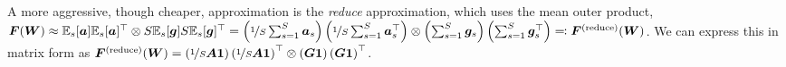 A more aggressive, though cheaper, approximation is the \emph{reduce} approximation, which uses the mean outer product, ${\bm{F}}({\bm{W}}) \approx \mathbb{E}_s[{\bm{a}}] \mathbb{E}_s[{\bm{a}}]^{\top} \otimes S \mathbb{E}_s[{\bm{g}}] S \mathbb{E}_s[{\bm{g}}]^{\top} = \left(\nicefrac{1}{S} \sum_{s=1}^S {\bm{a}}_s \right) \left( \nicefrac{1}{S} \sum_{s=1}^S {\bm{a}}_s^{\top}\right) \otimes \left(\sum_{s=1}^S {\bm{g}}_s \right) \left(\sum_{s=1}^S {\bm{g}}_s^{\top} \right) \eqqcolon {\bm{F}}^{(\text{reduce})}({\bm{W}})$.
We can express this in matrix form as ${\bm{F}}^{(\text{reduce})}({\bm{W}}) = \left( \nicefrac{1}{S} {\bm{A}} {\bm{1}} \right) \left( \nicefrac{1}{S} {\bm{A}} {\bm{1}} \right)^{\top} \otimes \left({\bm{G}} {\bm{1}} \right) \left( {\bm{G}} {\bm{1}} \right)^{\top}$.
